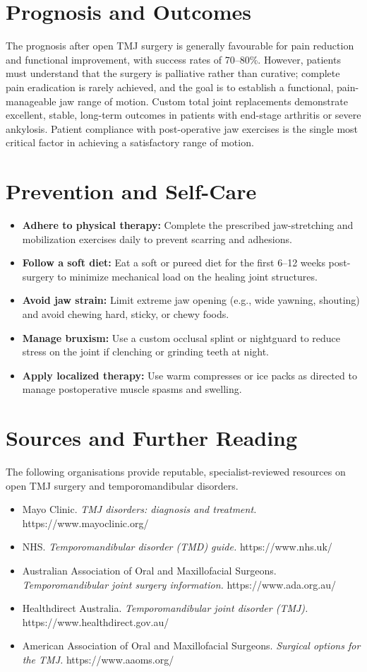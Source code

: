 \section*{Prognosis and Outcomes}
The prognosis after open TMJ surgery is generally favourable for pain reduction and functional improvement, with success rates of 70--80\%. However, patients must understand that the surgery is palliative rather than curative; complete pain eradication is rarely achieved, and the goal is to establish a functional, pain-manageable jaw range of motion. Custom total joint replacements demonstrate excellent, stable, long-term outcomes in patients with end-stage arthritis or severe ankylosis. Patient compliance with post-operative jaw exercises is the single most critical factor in achieving a satisfactory range of motion.

\section*{Prevention and Self-Care}
\begin{itemize}
    \item \textbf{Adhere to physical therapy:} Complete the prescribed jaw-stretching and mobilization exercises daily to prevent scarring and adhesions.
    \item \textbf{Follow a soft diet:} Eat a soft or pureed diet for the first 6--12 weeks post-surgery to minimize mechanical load on the healing joint structures.
    \item \textbf{Avoid jaw strain:} Limit extreme jaw opening (e.g., wide yawning, shouting) and avoid chewing hard, sticky, or chewy foods.
    \item \textbf{Manage bruxism:} Use a custom occlusal splint or nightguard to reduce stress on the joint if clenching or grinding teeth at night.
    \item \textbf{Apply localized therapy:} Use warm compresses or ice packs as directed to manage postoperative muscle spasms and swelling.
\end{itemize}

\section*{Sources and Further Reading}
The following organisations provide reputable, specialist-reviewed resources on open TMJ surgery and temporomandibular disorders.
\begin{itemize}
    \item Mayo Clinic. \textit{TMJ disorders: diagnosis and treatment.} https://www.mayoclinic.org/
    \item NHS. \textit{Temporomandibular disorder (TMD) guide.} https://www.nhs.uk/
    \item Australian Association of Oral and Maxillofacial Surgeons. \textit{Temporomandibular joint surgery information.} https://www.ada.org.au/
    \item Healthdirect Australia. \textit{Temporomandibular joint disorder (TMJ).} https://www.healthdirect.gov.au/
    \item American Association of Oral and Maxillofacial Surgeons. \textit{Surgical options for the TMJ.} https://www.aaoms.org/
\end{itemize}
